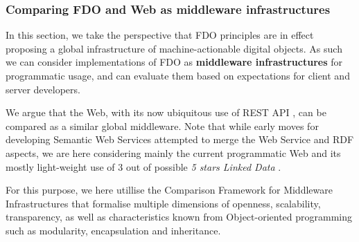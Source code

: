 \subsubsection{Comparing FDO and Web as middleware infrastructures}\label{ch3:middleware}

In this section, we take the perspective that FDO principles are in effect proposing a global infrastructure of machine-actionable digital objects. As such we can consider implementations of FDO as \textbf{middleware infrastructures} for programmatic usage, and can evaluate them based on expectations for client and server developers.

We argue that the Web, with its now ubiquitous use of REST API \cite{fieldingArchitecturalStylesDesign2000a}, can be compared as a similar global middleware. Note that while early moves for developing Semantic Web Services \cite{fenselSemanticWebServices2011} attempted to merge the Web Service and RDF aspects, we are here considering mainly the current programmatic Web and its mostly light-weight use of 3 out of possible \emph{5 stars Linked Data} \cite{OpenData}.

For this purpose, we here utillise the Comparison Framework for Middleware Infrastructures \cite{zarrasComparisonFrameworkMiddleware2004a} that formalise multiple dimensions of openness, scalability, transparency, as well as characteristics known from Object-oriented programming such as modularity, encapsulation and inheritance.

